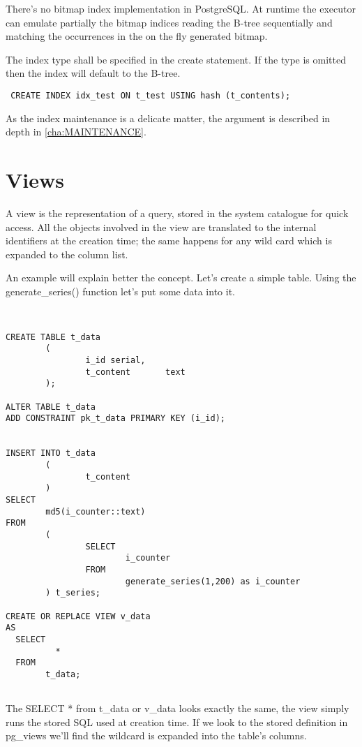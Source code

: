There's no bitmap index implementation in PostgreSQL. 
At runtime the executor can emulate partially the bitmap indices reading the 
B-tree sequentially and matching the occurrences in the on the fly generated 
bitmap. 

The index type shall be specified in the create statement. If the type is 
omitted then the index will default to the B-tree.

\begin{verbatim}
 CREATE INDEX idx_test ON t_test USING hash (t_contents);
\end{verbatim}


As the index maintenance is a delicate matter, the argument is described in 
depth in \ref{cha:MAINTENANCE}.


\section{Views}
A view is the representation of a query, stored in the system catalogue 
for quick access. All the objects involved in the view are translated to the 
internal identifiers at the creation time; the same happens for any wild card 
which is expanded to the column list.

An example will explain better the concept. Let's create a simple table. Using 
the generate\_series() function let's put some data into it.

\begin{verbatim}


CREATE TABLE t_data 
        ( 
                i_id serial,
                t_content       text
        );

ALTER TABLE t_data 
ADD CONSTRAINT pk_t_data PRIMARY KEY (i_id);


INSERT INTO t_data
        (
                t_content
        )
SELECT
        md5(i_counter::text)
FROM
        (
                SELECT
                        i_counter
                FROM
                        generate_series(1,200) as i_counter
        ) t_series;

CREATE OR REPLACE VIEW v_data 
AS 
  SELECT 
          *
  FROM 
        t_data;


\end{verbatim}

The SELECT * from t\_data or v\_data looks exactly the same, the view 
simply runs the stored SQL used at creation time.
If we look to the stored definition in pg\_views we'll find the wildcard is 
expanded into the table's columns.



